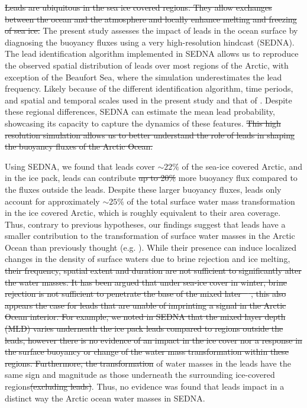 \documentclass[lineno,sn-basic]{sn-jnl}%
\providecommand{\DIFadd}[1]{{\protect\color{blue}\uwave{#1}}} %
\providecommand{\DIFdel}[1]{{\protect\color{red}\sout{#1}}}                      %
\providecommand{\DIFaddbegin}{} %
\providecommand{\DIFaddend}{} %
\providecommand{\DIFdelbegin}{} %
\providecommand{\DIFdelend}{} %
\newcommand{\DIFscaledelfig}{0.5}
\newlength{\DIFdelgraphicswidth} %
\newlength{\DIFdelgraphicsheight} %
\newcommand{\DIFaddincludegraphics}[2][]{{\color{blue}\fbox{\DIFOincludegraphics[#1]{#2}}}} %
\newcommand{\DIFdelincludegraphics}[2][]{%
\sbox{\DIFdelgraphicsbox}{\DIFOincludegraphics[#1]{#2}}%
\settoboxwidth{\DIFdelgraphicswidth}{\DIFdelgraphicsbox} %
\settoboxtotalheight{\DIFdelgraphicsheight}{\DIFdelgraphicsbox} %
\scalebox{\DIFscaledelfig}{%
\parbox[b]{\DIFdelgraphicswidth}{\usebox{\DIFdelgraphicsbox}\\[-\baselineskip] \rule{\DIFdelgraphicswidth}{0em}}\llap{\resizebox{\DIFdelgraphicswidth}{\DIFdelgraphicsheight}{%
\setlength{\unitlength}{\DIFdelgraphicswidth}%
\begin{picture}(1,1)%
\thicklines\linethickness{2pt} %
{\color[rgb]{1,0,0}\put(0,0){\framebox(1,1){}}}%
{\color[rgb]{1,0,0}\put(0,0){\line( 1,1){1}}}%
{\color[rgb]{1,0,0}\put(0,1){\line(1,-1){1}}}%
\end{picture}%
}\hspace*{3pt}}} %
} %
\DeclareRobustCommand{\DIFaddbegin}{\DIFOaddbegin \let\includegraphics\DIFaddincludegraphics} %
\DeclareRobustCommand{\DIFaddend}{\DIFOaddend \let\includegraphics\DIFOincludegraphics} %
\DeclareRobustCommand{\DIFdelbegin}{\DIFOdelbegin \let\includegraphics\DIFdelincludegraphics} %
\DeclareRobustCommand{\DIFdelend}{\DIFOaddend \let\includegraphics\DIFOincludegraphics} %
\begin{document}
\DIFdelbegin \DIFdel{Leads are ubiquitous in the sea ice covered regions. They allow exchanges between the ocean and the atmosphere and locally enhance melting and freezing of sea ice. }\DIFdelend The present study assesses the impact of leads in the ocean surface by diagnosing the buoyancy fluxes using a very high-resolution hindcast (SEDNA). The lead identification algorithm implemented in SEDNA allows us to reproduce the observed spatial distribution of leads over most regions of the Arctic, with exception of the Beaufort Sea, where the simulation underestimates the lead frequency. Likely because of the different identification algorithm, time periods, and spatial and temporal scales used in the present study and that of \citealp{Willmes_leads_currents_2023}. Despite these regional differences, SEDNA can estimate the mean lead probability, showcasing its capacity to capture the dynamics of these features.
\DIFdelbegin \DIFdel{This high resolution simulation allows us to better understand the role of leads in shaping the buoyancy fluxes of the Arctic Ocean.
}\DIFdelend 

Using SEDNA, we found that leads cover $\sim 22\%$ of the sea-ice covered Arctic, and in the ice pack, leads can contribute \DIFdelbegin \DIFdel{up to 20\% }\DIFdelend more buoyancy flux compared to the fluxes outside the leads. Despite these larger buoyancy fluxes, leads only account for approximately $\sim 25\%$ of the total surface water mass transformation in the ice covered Arctic, which is roughly equivalent to their area coverage. Thus, contrary to previous hypotheses, our findings suggest that leads have a smaller contribution to the transformation of surface water masses in the Arctic Ocean than previously thought (e.g. \citealp{Hutter_identification_2019, McPhee_LKF_2005}). While their presence can induce localized changes in the density of surface waters due to brine rejection and ice melting, 
\DIFdelbegin \DIFdel{their frequency, spatial extent and duration are not sufficient to significantly alter the water masses. It has been argued that under sea-ice cover in winter, brine rejection is not sufficient to penetrate the base of the mixed later \mbox{%
\citep{Lenn_mixing_2022}}\hskip0pt%
, this also appears the case for leads that are unable of imprinting a signal in the Arctic Ocean interior. For example, we noted in SEDNA that the mixed layer depth (MLD) varies underneath the ice pack leads compared to regions outside the leads, however there is no evidence of an impact in the ice cover nor a response in the surface buoyancy or change of the water mass transformation within these regions. Furthermore, the transformation }\DIFdelend \DIFaddbegin \DIFadd{the transformation }\DIFaddend of water masses in the leads have the same sign and magnitude as those underneath the surrounding ice-covered regions\DIFdelbegin \DIFdel{(excluding leads)}\DIFdelend . Thus, no evidence was found that leads impact in a distinct way the Arctic ocean water masses in SEDNA.
\end{document}
